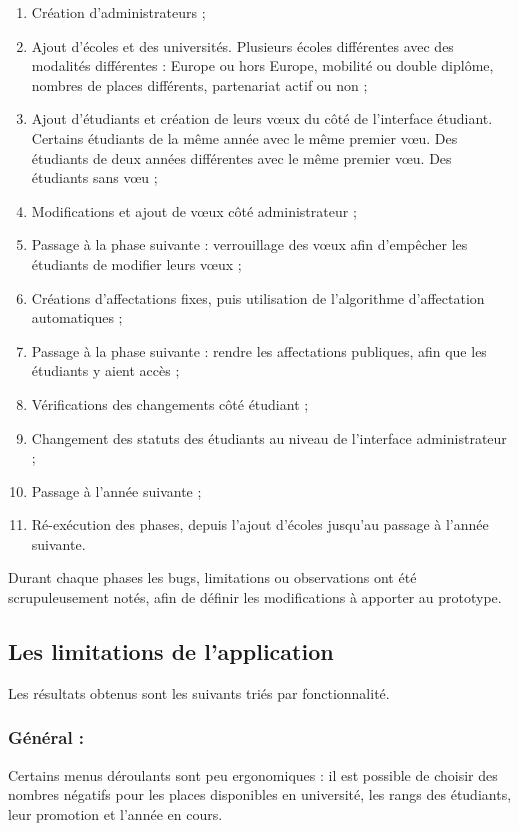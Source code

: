 \begin{enumerate}
\item Création d'administrateurs ;
\item Ajout d'écoles et des universités. Plusieurs écoles différentes avec des modalités différentes : Europe ou hors Europe, mobilité ou double diplôme, nombres de places différents, partenariat actif ou non ;
\item Ajout d'étudiants et création de leurs vœux du côté de l'interface étudiant. Certains étudiants de la même année avec le même premier vœu. Des étudiants de deux années différentes avec le même premier vœu. Des étudiants sans vœu ;
\item Modifications et ajout de vœux côté administrateur ;
\item Passage à la phase suivante : verrouillage des vœux afin d'empêcher les étudiants de modifier leurs vœux ;
\item Créations d'affectations fixes, puis utilisation de l'algorithme d'affectation automatiques ;
\item Passage à la phase suivante : rendre les affectations publiques, afin que les étudiants y aient accès ;
\item Vérifications des changements côté étudiant ;
\item Changement des statuts des étudiants au niveau de l'interface administrateur ;
\item Passage à l'année suivante ;
\item Ré-exécution des phases, depuis l'ajout d'écoles jusqu'au passage à l'année suivante.
\end{enumerate}


Durant chaque phases les bugs, limitations ou observations ont été scrupuleusement notés, afin de définir les modifications à apporter au prototype.


\subsection{Les limitations de l'application}

Les résultats obtenus sont les suivants triés par fonctionnalité.

\subsubsection{Général :}
Certains menus déroulants sont peu ergonomiques : il est possible de choisir des nombres négatifs pour les places disponibles en université, les rangs des étudiants, leur promotion et l'année en cours.


